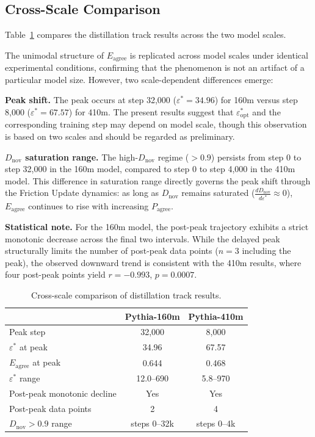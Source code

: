 \documentclass[11pt,a4paper]{article}
\begin{document}
\subsection{Cross-Scale Comparison}

Table~\ref{tab:crossscale} compares the distillation track results across the two model scales.

The unimodal structure of $E_\mathrm{agree}$ is replicated across model scales under
identical experimental conditions, confirming that the phenomenon is not an artifact of a
particular model size. However, two scale-dependent differences emerge:

\textbf{Peak shift.} The peak occurs at step 32,000 ($\varepsilon^* = 34.96$) for 160m
versus step 8,000 ($\varepsilon^* = 67.57$) for 410m. The present results suggest that
$\varepsilon^*_\mathrm{opt}$ and the corresponding training step may depend on model scale,
though this observation is based on two scales and should be regarded as preliminary.

\textbf{$D_\mathrm{nov}$ saturation range.} The high-$D_\mathrm{nov}$ regime ($> 0.9$)
persists from step 0 to step 32,000 in the 160m model, compared to step 0 to step 4,000 in
the 410m model. This difference in saturation range directly governs the peak shift through
the Friction Update dynamics: as long as $D_\mathrm{nov}$ remains saturated
($\frac{dD_\mathrm{nov}}{d\varepsilon^*} \approx 0$), $E_\mathrm{agree}$ continues to rise
with increasing $P_\mathrm{agree}$.

\textbf{Statistical note.} For the 160m model, the post-peak trajectory exhibits a strict
monotonic decrease across the final two intervals. While the delayed peak structurally limits
the number of post-peak data points ($n = 3$ including the peak), the observed downward trend
is consistent with the 410m results, where four post-peak points yield $r = -0.993$,
$p = 0.0007$.

\begin{table}[t]
\centering
\caption{Cross-scale comparison of distillation track results.}
\label{tab:crossscale}
\begin{tabular}{lcc}
\toprule
& Pythia-160m & Pythia-410m \\
\midrule
Peak step             & 32,000  & 8,000  \\
$\varepsilon^*$ at peak & 34.96 & 67.57  \\
$E_\mathrm{agree}$ at peak & 0.644 & 0.468 \\
$\varepsilon^*$ range & 12.0--690 & 5.8--970 \\
Post-peak monotonic decline & Yes & Yes \\
Post-peak data points & 2 & 4 \\
$D_\mathrm{nov} > 0.9$ range & steps 0--32k & steps 0--4k \\
\bottomrule
\end{tabular}
\end{table}
\end{document}
